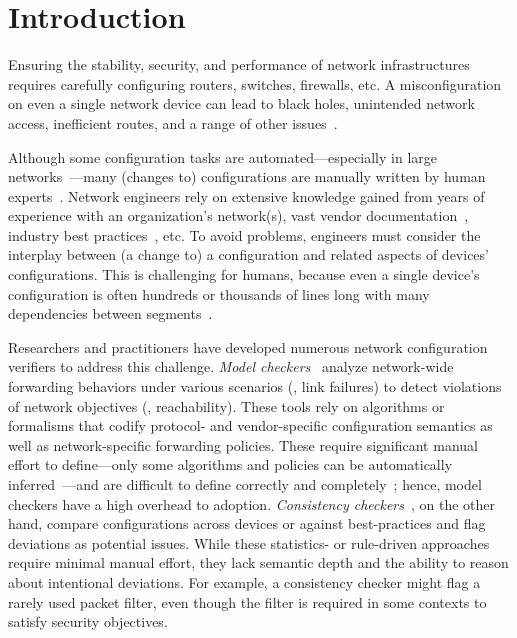
\section{Introduction}
\label{sec:intro}

Ensuring the stability, security, and performance of network infrastructures
requires carefully configuring routers, switches, firewalls, etc. A misconfiguration on even a single network device can lead to black holes, unintended network access, inefficient routes, and a range of other issues~\cite{gill2011understanding, turner2010california}.

Although some configuration tasks are automated---especially in large networks~\cite{tian2019jinjing, ramanathan2023aura, mahimkar2022aurora, rasche2023esnet, gember-jacobson2015mpa}---many (changes to) configurations are manually written by human experts~\cite{abhashkumar2020aed}. Network engineers rely on extensive knowledge gained from years of experience with an organization's network(s), vast vendor documentation~\cite{ciscosupport, junosdocumentation}, industry best practices~\cite{manrs}, etc. To avoid problems, engineers must consider the interplay between (a change to) a configuration and related aspects of devices' configurations. This is challenging for humans, because even a single device's configuration is often hundreds or thousands of lines long with many dependencies between segments~\cite{benson2009complexitymetrics}.


Researchers and practitioners have developed numerous network configuration verifiers to address this challenge.
{\em Model checkers}~\cite{fogel2015general, beckett2017general, abhashkumar2020tiramisu, prabhu2020plankton, zhang2022sre, steffen2020netdice, ye2020hoyan, ritchey2000using,al2011configchecker, jeffrey2009model, batfish} analyze network-wide forwarding behaviors under various scenarios (\eg, link failures) to detect violations of network objectives (\eg, reachability). These tools rely on
algorithms or formalisms that codify protocol- and vendor-specific configuration semantics as well as network-specific forwarding policies. These require significant manual effort to define---only some algorithms and policies can be automatically inferred~\cite{birkner2020config2spec, kheradmand2020anime, sharma2023prosper}---and are difficult to define correctly and completely~\cite{ye2020hoyan, birkner2021metha}; hence, model checkers have a high overhead to adoption.
{\em Consistency checkers}~\cite{kakarla2024diffy,kakarla2020finding, le2006minerals, feamster2005detecting, tang2021campion, le2008detecting, le2006characterization, batfish}, on the other hand, compare configurations across devices or against best-practices and flag deviations as potential issues.
While these statistics- or rule-driven approaches require minimal manual effort, they lack semantic depth and the ability to reason about intentional deviations.
For example, a consistency checker might flag a rarely used packet filter, even though the filter is required in some contexts to satisfy security objectives.


